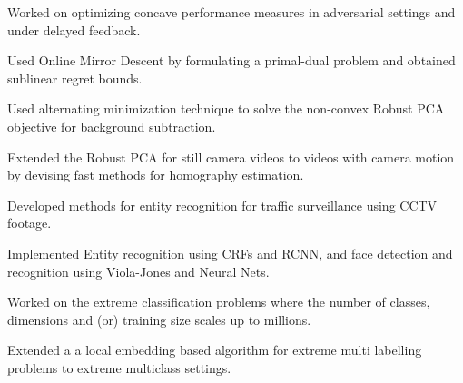 \documentclass[US paper]{deedy-resume} %
\begin{document}
\begin{tightitemize}
\item Worked on optimizing concave performance measures in adversarial settings and under delayed feedback.
\item Used Online Mirror Descent by formulating a primal-dual problem and obtained sublinear regret bounds.
\end{tightitemize}
\vspace{1mm}



\begin{tightitemize}
\item Used alternating minimization technique to solve the non-convex Robust PCA objective for background subtraction.
\item Extended the Robust PCA for still camera videos to videos with camera motion by devising fast methods for homography estimation.
\end{tightitemize}
\vspace{1mm}



\begin{tightitemize}
\item Developed methods for entity recognition for traffic surveillance using CCTV footage.
\item Implemented Entity recognition using CRFs and RCNN, and face detection and recognition using Viola-Jones and Neural Nets.
\end{tightitemize}
\vspace{1mm}

\begin{tightitemize}
\item Worked on the extreme classification problems where the number of classes, dimensions and (or) training size scales up to millions.
\item Extended a a local embedding based algorithm for extreme multi labelling problems to extreme multiclass settings.
\end{tightitemize}
\end{document}
